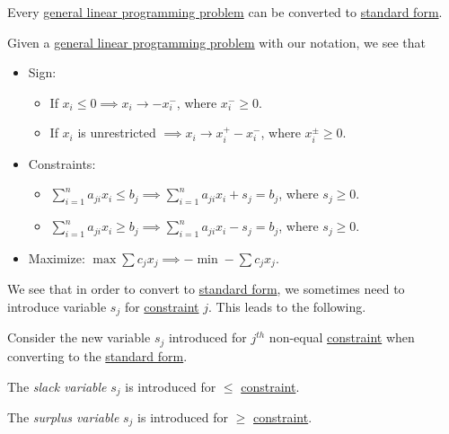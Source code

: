 \begin{remark}
	Every \hyperref[def:general-linear-programming-problem]{general linear programming problem} can be converted to \hyperref[def:standard-form]{standard form}.
\end{remark}
\begin{explanation}
	Given a \hyperref[def:general-linear-programming-problem]{general linear programming problem} with our notation, we see that
	\begin{itemize}
		\item Sign:
		      \begin{itemize}
			      \item If \(x_i\leq 0 \implies x_i \to -x_i^-\), where \(x_i^- \geq 0\).
			      \item If \(x_i\) is unrestricted \(\implies x_i \to x_i^+ - x_i^-\), where \(x_i^{\pm} \geq 0\).
		      \end{itemize}
		\item Constraints:
		      \begin{itemize}
			      \item \(\sum\limits_{i=1}^{n} a_{ji} x_i \leq b_j \implies \sum\limits_{i=1}^{n} a_{ji} x_i + s_j = b_j\), where \(s_j \geq 0\).

			      \item \(\sum\limits_{i=1}^{n} a_{ji} x_i \geq b_j \implies \sum\limits_{i=1}^{n} a_{ji} x_i - s_j = b_j\), where \(s_j \geq 0\).

		      \end{itemize}
		\item Maximize: \(\max \sum c_{j}x_{j} \implies -\min -\sum c_{j}x_{j}\).
	\end{itemize}
\end{explanation}

We see that in order to convert to \hyperref[def:standard-form]{standard form}, we sometimes need to introduce variable \(s_j\) for \hyperref[def:structured-constraint]{constraint} \(j\). This leads to the following.

\begin{definition*}
	Consider the new variable \(s_j\) introduced for \(j^{th} \) non-equal \hyperref[def:structured-constraint]{constraint} when converting to the \hyperref[def:standard-form]{standard form}.

	\begin{definition}\label{def:slack-variable}
		The \emph{slack variable} \(s_j\) is introduced for \(\leq \) \hyperref[def:structured-constraint]{constraint}.
	\end{definition}
	\begin{definition}\label{def:surplus-variable}
		The \emph{surplus variable} \(s_j\) is introduced for \(\geq \) \hyperref[def:structured-constraint]{constraint}.
	\end{definition}
\end{definition*}